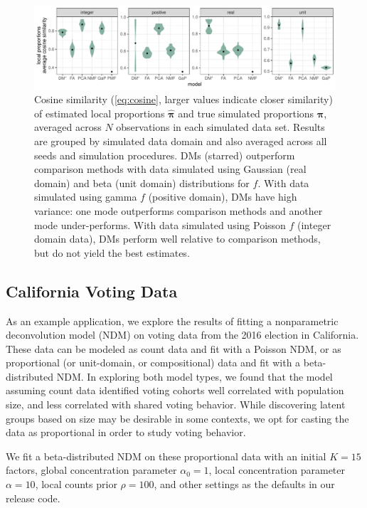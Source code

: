\documentclass[twoside,11pt]{article}
\begin{document}
\begin{figure}
\centering
\includegraphics[width=\textwidth]{pi_cosine.pdf}
\caption{Cosine similarity (\cref{eq:cosine}, larger values indicate closer similarity) of estimated local proportions $\hat{\boldsymbol{\pi}}$ and true simulated proportions $\boldsymbol{\pi}$, averaged across $N$ observations in each simulated data set.  Results are grouped by simulated data domain and also averaged across all seeds and simulation procedures. DMs (starred) outperform comparison methods with data simulated using Gaussian (real domain) and beta (unit domain) distributions for $f$.  With data simulated using gamma $f$ (positive domain), DMs have high variance: one mode outperforms comparison methods and another mode under-performs.  With data simulated using Poisson $f$ (integer domain data), DMs perform well relative to comparison methods, but do not yield the best estimates.
}
\label{fig:pi_cosine}
\end{figure}


\subsection{California Voting Data}
\label{sec:dat_vote}
As an example application, we explore the results of fitting a nonparametric deconvolution model (NDM) on voting data from the 2016 election in California.  These data can be modeled as count data and fit with a Poisson NDM, or as proportional (or unit-domain, or compositional) data and fit with a beta-distributed NDM.  In exploring both model types, we found that the model assuming count data identified voting cohorts well correlated with population size, and less correlated with shared voting behavior.  While discovering latent groups based on size may be desirable in some contexts, we opt for casting the data as proportional in order to study voting behavior.

We fit a beta-distributed NDM on these proportional data with an initial $K=15$ factors, global concentration   parameter $\alpha_0=1$, local concentration parameter $\alpha=10$, local counts prior $\rho=100$, and other settings as the defaults in our release code.
\end{document}

